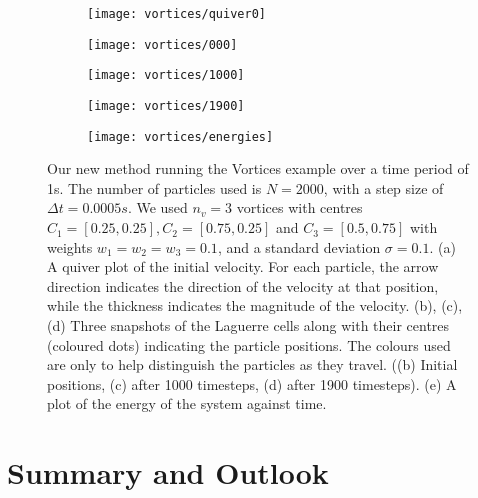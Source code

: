 \documentclass[11pt, oneside]{article}   	%
\newcommand{\dt}{\Delta t}
\begin{document}
\begin{figure}[h]
   \begin{subfigure}[t]{0.45\textwidth}
        \centering
        \texttt{[image: vortices/quiver0]}
        \caption{} \label{fig:vortices-quiver0}
    \end{subfigure}
   \begin{subfigure}[t]{0.45\textwidth}
        \centering
        \texttt{[image: vortices/000]}
        \caption{} \label{fig:vortices-000}
    \end{subfigure}
   \begin{subfigure}[t]{0.45\textwidth}
        \centering
	\texttt{[image: vortices/1000]}
        \caption{} \label{fig:vortices-1000}
    \end{subfigure}
   \begin{subfigure}[t]{0.45\textwidth}
        \centering
	\texttt{[image: vortices/1900]}
        \caption{} \label{fig:vortices-1900}
    \end{subfigure}
   \begin{subfigure}[t]{0.45\textwidth}
        \centering
	\texttt{[image: vortices/energies]}
        \caption{} \label{fig:vortices-energies}
    \end{subfigure}
\centering
\caption{Our new method running the Vortices example over a time period of 1s. The number of particles used is \(N = 2000\), with a step size of \(\dt = 0.0005s\). We used \(n_v = 3\) vortices with centres \(C_1 = [0.25, 0.25], C_2 = [0.75, 0.25] \) and \(C_3 = [0.5, 0.75]\) with weights \(w_1 = w_2 = w_3 = 0.1\), and a standard deviation \(\sigma = 0.1\). (a) A quiver plot of the initial velocity. For each particle, the arrow direction indicates the direction of the velocity at that position, while the thickness indicates the magnitude of the velocity. (b), (c), (d) Three snapshots of the Laguerre cells along with their centres (coloured dots) indicating the particle positions. The colours used are only to help distinguish the particles as they travel. ((b) Initial positions, (c) after 1000 timesteps, (d) after 1900 timesteps). (e) A plot of the energy of the system against time. }
\centering
\label{fig:vortices}
\end{figure}




\section{Summary and Outlook}
\end{document}
